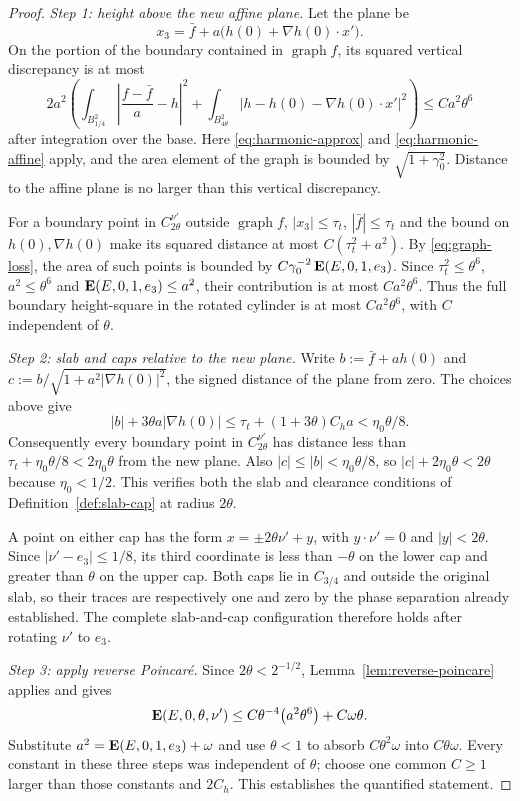 \begin{proof}
\emph{Step 1: height above the new affine plane.}  Let the plane be
\begin{equation}\label{eq:new-plane}
  x_3=\bar f+a\bigl(h(0)+\nabla h(0)\cdot x'\bigr).
\end{equation}
On the portion of the boundary contained in $\operatorname{graph}f$,
its squared vertical discrepancy is at most
\[
 2a^2\left(\int_{B^2_{1/4}}\left|\frac{f-\bar f}{a}-h\right|^2
 +\int_{B^2_{4\theta}}|h-h(0)-\nabla h(0)\cdot x'|^2\right)
 \le Ca^2\theta^6
\]
after integration over the base.  Here
\eqref{eq:harmonic-approx} and \eqref{eq:harmonic-affine} apply, and the
area element of the graph is bounded by $\sqrt{1+\gamma_0^2}$.
Distance to the affine plane is no larger than this vertical discrepancy.

For a boundary point in $C_{2\theta}^{\nu'}$ outside $\operatorname{graph}f$,
$|x_3|\le\tau_t$, $|\bar f|\le\tau_t$ and the bound on $h(0),\nabla h(0)$
make its squared distance at most $C(\tau_t^2+a^2)$.  By
\eqref{eq:graph-loss}, the area of such points is bounded by
$C\gamma_0^{-2}\operatorname{\mathbf E}(E,0,1,e_3)$.  Since
$\tau_t^2\le\theta^6$, $a^2\le\theta^6$ and
$\operatorname{\mathbf E}(E,0,1,e_3)\le a^2$, their contribution is at most $Ca^2\theta^6$.
Thus the full boundary height-square in the rotated cylinder is at most
$Ca^2\theta^6$, with $C$ independent of $\theta$.

\emph{Step 2: slab and caps relative to the new plane.}
Write $b:=\bar f+ah(0)$ and
$c:=b/\sqrt{1+a^2|\nabla h(0)|^2}$, the signed distance of the plane from
zero.  The choices above give
\begin{equation}\label{eq:chebyshev}
 |b|+3\theta a|\nabla h(0)|
 \le\tau_t+(1+3\theta)C_ha<\eta_0\theta/8.
\end{equation}
Consequently every boundary point in $C_{2\theta}^{\nu'}$ has distance
less than $\tau_t+\eta_0\theta/8<2\eta_0\theta$ from the new plane.
Also $|c|\le|b|<\eta_0\theta/8$, so
$|c|+2\eta_0\theta<2\theta$ because $\eta_0<1/2$.
This verifies both the slab and clearance conditions of
Definition~\ref{def:slab-cap} at radius $2\theta$.

A point on either cap has the form $x=\pm2\theta\nu'+y$, with
$y\cdot\nu'=0$ and $|y|<2\theta$.  Since $|\nu'-e_3|\le1/8$, its third
coordinate is less than $-\theta$ on the lower cap and greater than
$\theta$ on the upper cap.  Both caps lie in $C_{3/4}$ and outside the
original slab, so their traces are respectively one and zero by the phase
separation already established.  The complete slab-and-cap configuration
therefore holds after rotating $\nu'$ to $e_3$.

\emph{Step 3: apply reverse Poincar\'e.}
Since $2\theta<2^{-1/2}$, Lemma~\ref{lem:reverse-poincare} applies and gives
\[
  \operatorname{\mathbf E}(E,0,\theta,\nu')
  \le C\theta^{-4}\bigl(a^2\theta^6\bigr)+C\omega\theta.
\]
Substitute $a^2=\operatorname{\mathbf E}(E,0,1,e_3)+\omega$ and use $\theta<1$ to absorb
$C\theta^2\omega$ into $C\theta\omega$.  Every constant in these three
steps was independent of $\theta$; choose one common $C\ge1$ larger than
those constants and $2C_h$.  This establishes the quantified statement.
\end{proof}

